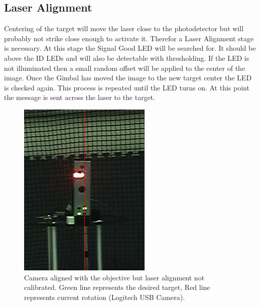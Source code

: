 \documentclass[botnum, fleqn]{unmeethesis}
\begin{document}
\subsection*{Laser Alignment}
Centering of the target will move the laser close to the photodetector but will probably not strike close enough to activate it. Therefor a Laser Alignment stage is necessary. At this stage the Signal Good LED will be searched for. It should be above the ID LEDs and will also be detectable with thresholding. If the LED is not illuminated then a small random offset will be applied to the center of the image. Once the Gimbal has moved the image to the new target center the LED is checked again. This process is repeated until the LED turns on.  At this point the message is sent across the laser to the target.


\begin{figure}[ht]
 \begin{center}
  \includegraphics[width=0.5 \textwidth]{figures/precalibration.png}
  \caption{\small \label{fig:precalibration} Camera aligned with the objective but laser alignment not calibrated. Green line represents the desired target, Red line represents current rotation (Logitech USB Camera).}
 \end{center}
\end{figure}
\end{document}

